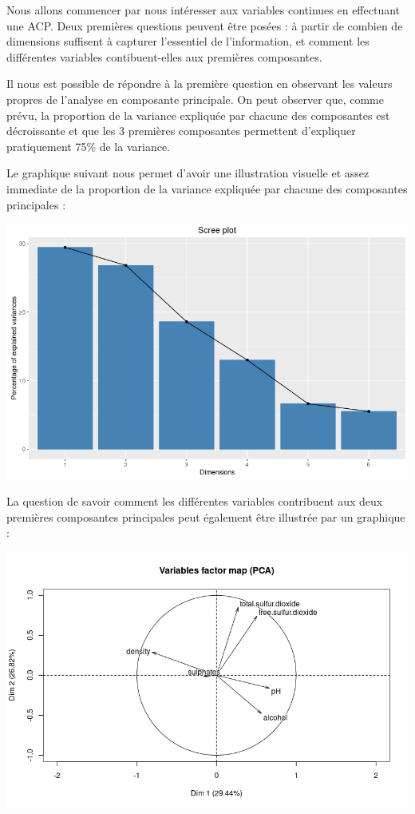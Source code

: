 \documentclass[11pt,a4paper]{article}
\begin{document}
Nous allons commencer par nous intéresser aux variables continues en effectuant une ACP. Deux premières questions peuvent être posées : à partir de combien de dimensions suffisent à capturer l'essentiel de l'information, et comment les différentes variables contibuent-elles aux premières composantes.

Il nous est possible de répondre à la première question en observant les valeurs propres de l'analyse en composante principale. On peut observer que, comme prévu, la proportion de la variance expliquée par chacune des composantes est décroissante et que les 3 premières composantes permettent d'expliquer pratiquement 75\% de la variance.

Le graphique suivant nous permet d'avoir une illustration visuelle et assez immediate de la proportion de la variance expliquée par chacune des composantes principales :

\begin{center}
\includegraphics[scale=0.4]{"screeplot"}
\end{center}

La question de savoir comment les différentes variables contribuent aux deux premières composantes principales peut également être illustrée par un graphique :

\begin{center}
\includegraphics[scale=0.5]{"factormap"}
\end{center}
\end{document}
